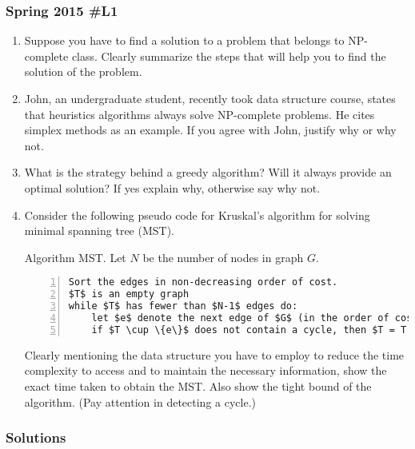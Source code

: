 \subsubsection{Spring 2015 \#L1}
\begin{enumerate}
		\item Suppose you have to find a solution to a problem that belongs to NP-complete class.  Clearly summarize the steps that will help you to find the solution of the problem.  
		\item John, an undergraduate student, recently took data structure course, states that heuristics algorithms always solve NP-complete problems.  He cites simplex methods as an example.  If you agree with John, justify why or why not.  
		\item What is the strategy behind a greedy algorithm?  Will it always provide an optimal solution?  If yes explain why, otherwise say why not.  
		\item Consider the following pseudo code for Kruskal's algorithm for solving minimal spanning tree (MST).

Algorithm MST.  Let $N$ be the number of nodes in graph $G$.  

\begin{lstlisting}[numbers=left, mathescape=True]
Sort the edges in non-decreasing order of cost.
$T$ is an empty graph
while $T$ has fewer than $N-1$ edges do:
	let $e$ denote the next edge of $G$ (in the order of cost)
	if $T \cup \{e\}$ does not contain a cycle, then $T = T \cup \{e\}$
\end{lstlisting}

Clearly mentioning the data structure you have to employ to reduce the time complexity to access and to maintain the necessary information, show the exact time taken to obtain the MST.  Also show the tight bound of the algorithm.  (Pay attention in detecting a cycle.)
		
	\end{enumerate}


\subsubsection{Solutions}

